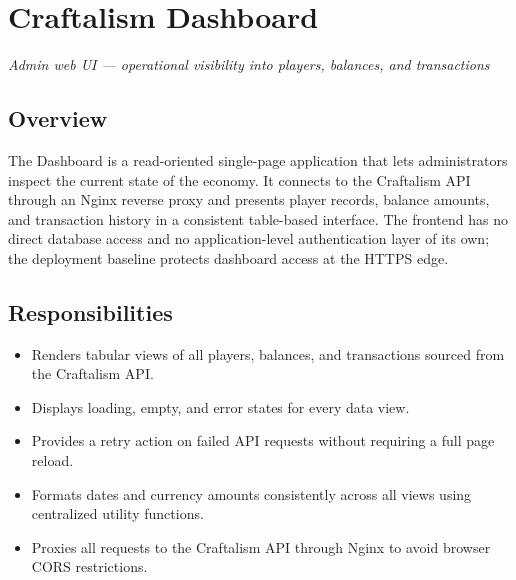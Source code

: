 

\chapter{Craftalism Dashboard}
\label{ch:dashboard}


\textcolor{CraftGray}{\textit{Admin web UI — operational visibility into players, balances, and transactions}}

\bigskip

\section{Overview}

The Dashboard is a read-oriented single-page application that lets administrators inspect the current state of the economy. It connects to the Craftalism API through an Nginx reverse proxy and presents player records, balance amounts, and transaction history in a consistent table-based interface. The frontend has no direct database access and no application-level authentication layer of its own; the deployment baseline protects dashboard access at the HTTPS edge.

\section{Responsibilities}

\begin{itemize}
  \item Renders tabular views of all players, balances, and transactions sourced from the Craftalism API.
  \item Displays loading, empty, and error states for every data view.
  \item Provides a retry action on failed API requests without requiring a full page reload.
  \item Formats dates and currency amounts consistently across all views using centralized utility functions.
  \item Proxies all  requests to the Craftalism API through Nginx to avoid browser CORS restrictions.
\end{itemize}

